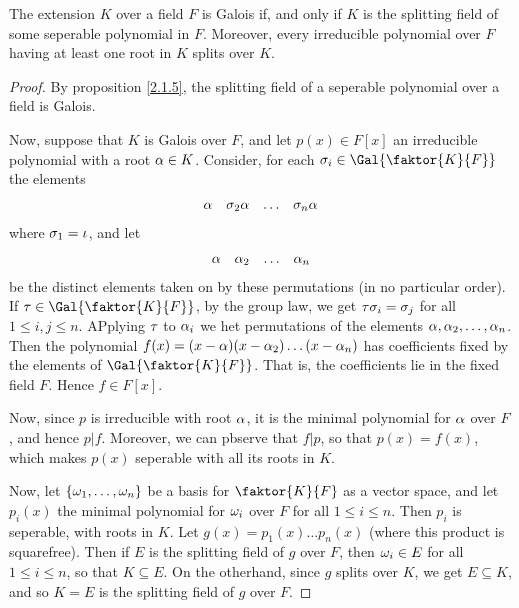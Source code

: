 \begin{theorem}\label{2.2.3}
    The extension $K$ over a field  $F$ is Galois if, and only if $K$ is the
    splitting field of some seperable polynomial in $F$. Moreover, every
    irreducible polynomial over $F$ having at least one root in  $K$ splits over
     $K$.
\end{theorem}
\begin{proof}
    By proposition \ref{2.1.5}, the splitting field of a seperable polynomial over a
    field is Galois.

    Now, suppose that $K$ is Galois over  $F$, and let  $p(x) \in F[x]$ an
    irreducible polynomial with a root $\alpha \in K$. Consider, for each  $\s_i \in
    \Gal{\faktor{K}{F}}$ the elements
    \begin{align*}
        \alpha  &&   \sigma_2\alpha  &&   \dots   &&   \sigma_n\alpha  \\
    \end{align*}
    where $\sigma_1=\iota$, and let
    \begin{align*}
        \alpha  &&   \alpha_2  &&   \dots   &&   \alpha_n  \\
    \end{align*}
    be the distinct elements taken on by these permutations (in no particular
    order). If $\t \in \Gal{\faktor{K}{F}}$, by the group law, we get
    $\tau\sigma_i=\sigma_j$ for all  $1 \leq i,j \leq n$. APplying  $\tau$ to  $\alpha_i$ we
    het permutations of the elements  $\alpha, \alpha_2, \dots, \alpha_n$. Then the
    polynomial $f(x)=(x-\alpha)(x-\alpha_2) \dots (x-\alpha_n)$ has coefficients fixed by
    the elements of $\Gal{\faktor{K}{F}}$. That is, the coefficients lie in the
    fixed field $F$. Hence  $f \in F[x]$.

    Now, since $p$ is irreducible with root $\alpha$, it is the minimal polynomial
    for $\alpha$ over $F$, and hence  $p|f$. Moreover, we can pbserve that $f|p$, so
    that  $p(x)=f(x)$, which makes  $p(x)$ seperable with all its roots in  $K$.

    Now, let $\{\omega_1, \dots, \omega_n\}$ be a basis for $\faktor{K}{F}$ as a vector
    space, and let $p_i(x)$ the minimal polynomial for $\omega_i$ over $F$ for all
    $1 \leq i \leq n$. Then  $p_i$ is seperable, with roots in  $K$. Let
    $g(x)=p_1(x) \dots p_n(x)$ (where this product is squarefree). Then if $E$
    is the splitting field of  $g$ over  $F$, then $\omega_i \in E$ for all  $1 \leq
    i \leq n$, so that  $K \subseteq E$. On the otherhand, since  $g$ splits
    over  $K$, we get  $E \subseteq K$, and so  $K=E$ is the splitting field of
     $g$ over $F$.
\end{proof}

